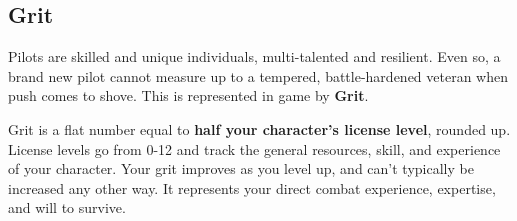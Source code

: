 \subsection{Grit}

Pilots are skilled and unique individuals, multi-talented and resilient. Even so, a brand new pilot
cannot measure up to a tempered, battle-hardened veteran when push comes to shove. This is
represented in game by \textbf{Grit}.

Grit is a flat number equal to \textbf{half your character's license level}, rounded up. License levels go
from 0-12 and track the general resources, skill, and experience of your character. Your grit
improves as you level up, and can't typically be increased any other way. It represents your direct
combat experience, expertise, and will to survive.